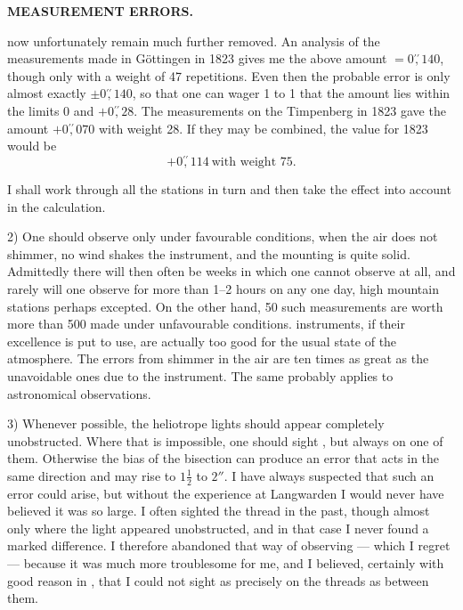 \par\clearpage
\noindent\null\hfill{\small\textbf{MEASUREMENT ERRORS.}}\hfill{}\par\medskip
\noindent now unfortunately remain much further removed. An analysis of the measurements made in Göttingen in 1823 gives me the above amount $=0\overset{\prime\prime}{,}140$, though only with a weight of 47 repetitions. Even then the probable error is only almost exactly $\pm0\overset{\prime\prime}{,}140$, so that one can wager 1 to 1 that the amount lies within the limits $0$ and $+0\overset{\prime\prime}{,}28$. The measurements on the Timpenberg in 1823 gave the amount $+0\overset{\prime\prime}{,}070$ with weight 28. If they may be combined, the value for 1823 would be
\[
+0\overset{\prime\prime}{,}114\ \text{with weight }75.
\]
\par\noindent\hspace*{\parindent}I shall work through all the stations in turn and then take the effect into account in the calculation.

\par\noindent\hspace*{\parindent}2) One should observe only under favourable conditions, when the air does not shimmer, no wind shakes the instrument, and the mounting is quite solid. Admittedly there will then often be weeks in which one cannot observe at all, and rarely will one observe for more than 1--2 hours on any one day, high mountain stations perhaps excepted. On the other hand, 50 such measurements are worth more than 500 made under unfavourable conditions.  instruments, if their excellence is  put to use, are actually too good for the usual state of the atmosphere. The errors from shimmer in the air are ten times as great as the unavoidable ones due to the instrument. The same probably applies to astronomical observations.

\par\noindent\hspace*{\parindent}3) Whenever possible, the heliotrope lights should appear completely unobstructed. Where that is impossible, one should sight , but always on one of them. Otherwise the bias of the bisection can produce an error that acts in the same direction and may rise to $1\frac12$ to $2''$. I have always suspected that such an error could arise, but without the experience at Langwarden I would never have believed it was so large. I often sighted  the thread in the past, though almost only where the light appeared unobstructed, and in that case I never found a marked difference. I therefore abandoned that way of observing --- which I  regret --- because it was much more troublesome for me, and I believed, certainly with good reason in , that I could not sight as precisely on the threads as between them.

